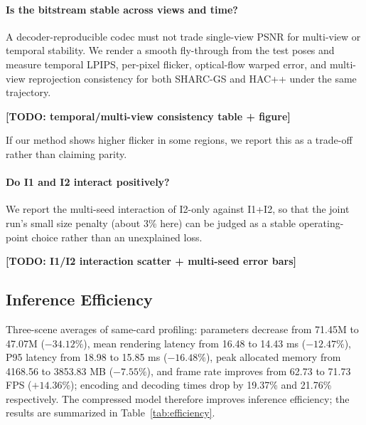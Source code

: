 \documentclass[conference]{IEEEtran}
\begin{document}
\paragraph{Is the bitstream stable across views and time?}
A decoder-reproducible codec must not trade single-view PSNR for
multi-view or temporal stability. We render a smooth fly-through from
the test poses and measure temporal LPIPS, per-pixel flicker, optical-flow
warped error, and multi-view reprojection consistency for both SHARC-GS
and HAC++ under the same trajectory.
\begin{center}\textbf{[TODO: temporal/multi-view consistency table + figure]}
\end{center}
If our method shows higher flicker in some regions, we report this as a
trade-off rather than claiming parity.

\paragraph{Do I1 and I2 interact positively?}
We report the multi-seed interaction of I2-only against I1+I2, so that
the joint run's small size penalty (about 3\% here) can be judged as a
stable operating-point choice rather than an unexplained loss.
\begin{center}\textbf{[TODO: I1/I2 interaction scatter + multi-seed error bars]}
\end{center}

\subsection{Inference Efficiency}
Three-scene averages of same-card profiling: parameters decrease from
71.45M to 47.07M ($-34.12\%$), mean rendering latency from 16.48 to
14.43 ms ($-12.47\%$), P95 latency from 18.98 to 15.85 ms ($-16.48\%$),
peak allocated memory from 4168.56 to 3853.83 MB ($-7.55\%$), and frame
rate improves from 62.73 to 71.73 FPS ($+14.36\%$); encoding and
decoding times drop by 19.37\% and 21.76\% respectively. The compressed
model therefore improves inference efficiency; the results are
summarized in Table~\ref{tab:efficiency}.
\end{document}
